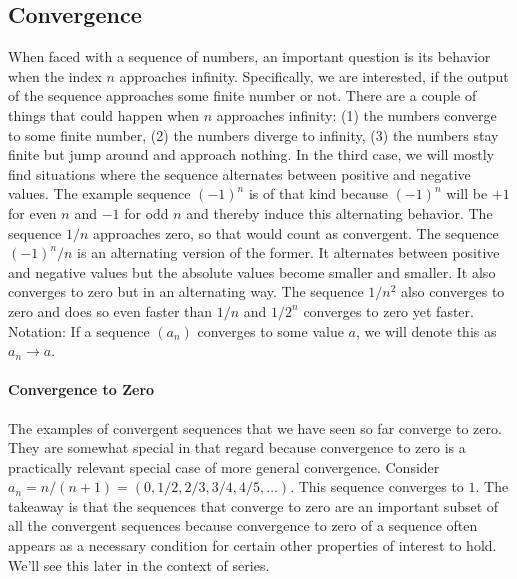 \subsection{Convergence}
When faced with a sequence of numbers, an important question is its behavior when the index $n$ approaches infinity. Specifically, we are interested, if the output of the sequence approaches some finite number or not. There are a couple of things that could happen when $n$ approaches infinity: (1) the numbers converge to some finite number, (2) the numbers diverge to infinity, (3) the numbers stay finite but jump around and approach nothing. In the third case, we will mostly find situations where the sequence alternates between positive and negative values. The example sequence $(-1)^n$ is of that kind because $(-1)^n$ will be $+1$ for even $n$ and $-1$ for odd $n$ and thereby induce this alternating behavior. The sequence $1/n$ approaches zero, so that would count as convergent. The sequence $(-1)^n / n$ is an alternating version of the former. It alternates between positive and negative values but the absolute values become smaller and smaller. It also converges to zero but in an alternating way. The sequence $1/n^2$ also converges to zero and does so even faster than $1/n$ and $1/2^n$ converges to zero yet faster. Notation: If a sequence $(a_n)$ converges to some value $a$, we will denote this as $a_n \rightarrow a$.





\paragraph{Convergence to Zero} The examples of convergent sequences that we have seen so far converge to zero. They are somewhat special in that regard because convergence to zero is a practically relevant special case of more general convergence. Consider $a_n = n/(n+1) = (0,1/2,2/3,3/4,4/5,\ldots)$. This sequence converges to $1$. The takeaway is that the sequences that converge to zero are an important subset of all the convergent sequences because convergence to zero of a sequence often appears as a necessary condition for certain other properties of interest to hold. We'll see this later in the context of series.


